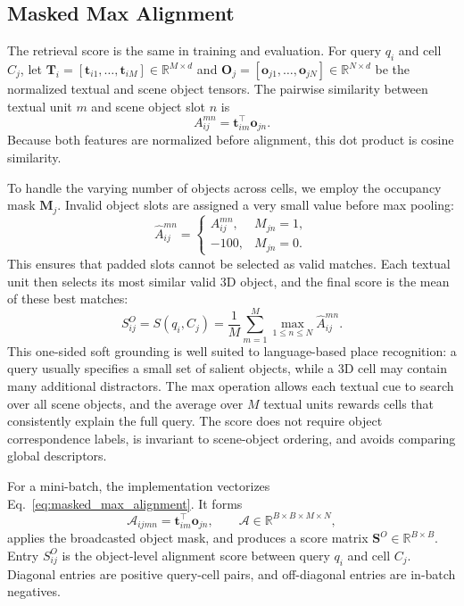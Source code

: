 \documentclass{article}
\begin{document}
\subsection{Masked Max Alignment}
\label{sec:masked_alignment}

The retrieval score is the same in training and evaluation. For query $q_i$ and cell $C_j$, let $\mathbf{T}_i=[\mathbf{t}_{i1},\ldots,\mathbf{t}_{iM}]\in\mathbb{R}^{M\times d}$ and $\mathbf{O}_j=[\mathbf{o}_{j1},\ldots,\mathbf{o}_{jN}]\in\mathbb{R}^{N\times d}$ be the normalized textual and scene object tensors. The pairwise similarity between textual unit $m$ and scene object slot $n$ is
\begin{equation}
A_{ij}^{mn}=\mathbf{t}_{im}^{\top}\mathbf{o}_{jn}.
\end{equation}
Because both features are normalized before alignment, this dot product is cosine similarity.

To handle the varying number of objects across cells, we employ the occupancy mask $\mathbf{M}_j$. Invalid object slots are assigned a very small value before max pooling:
\begin{equation}
\widehat{A}_{ij}^{mn}=\begin{cases}
A_{ij}^{mn},& M_{jn}=1,\\
-100,& M_{jn}=0.
\end{cases}
\end{equation}
This ensures that padded slots cannot be selected as valid matches. Each textual unit then selects its most similar valid 3D object, and the final score is the mean of these best matches:
\begin{equation}
S_{ij}^{O}=S(q_i,C_j)=\frac{1}{M}\sum_{m=1}^{M}\max_{1\leq n\leq N}\widehat{A}_{ij}^{mn}.
\label{eq:masked_max_alignment}
\end{equation}
This one-sided soft grounding is well suited to language-based place recognition: a query usually specifies a small set of salient objects, while a 3D cell may contain many additional distractors. The max operation allows each textual cue to search over all scene objects, and the average over $M$ textual units rewards cells that consistently explain the full query. The score does not require object correspondence labels, is invariant to scene-object ordering, and avoids comparing global descriptors.

For a mini-batch, the implementation vectorizes Eq.~\eqref{eq:masked_max_alignment}. It forms
\begin{equation}
\mathcal{A}_{ijmn}=\mathbf{t}_{im}^{\top}\mathbf{o}_{jn},
\qquad
\mathcal{A}\in\mathbb{R}^{B\times B\times M\times N},
\end{equation}
applies the broadcasted object mask, and produces a score matrix $\mathbf{S}^{O}\in\mathbb{R}^{B\times B}$. Entry $S_{ij}^{O}$ is the object-level alignment score between query $q_i$ and cell $C_j$. Diagonal entries are positive query-cell pairs, and off-diagonal entries are in-batch negatives.
\end{document}
